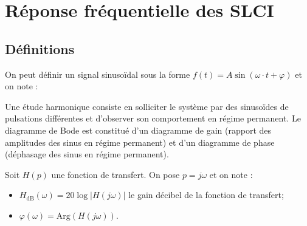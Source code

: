 \section{Réponse fréquentielle des SLCI}


\subsection{Définitions}



On peut définir un signal sinusoïdal sous la forme $
f(t)=A \sin(\omega \cdot t + \varphi)
$ et on note :


Une étude harmonique consiste en solliciter le système par des sinusoïdes de pulsations différentes et d'observer son comportement en régime permanent. Le diagramme de Bode est constitué d'un diagramme de gain (rapport des amplitudes des sinus en régime permanent) et d'un diagramme de phase (déphasage des sinus en régime permanent). 


\begin{defi}
Soit $H(p)$ une fonction de transfert. On pose $p=j\omega$ et on note :  
\begin{itemize}
\item $H_{\text{dB}}\left( \omega\right) =20\log |H(j\omega)|$ le gain décibel de la fonction de transfert;
\item $\varphi\left( \omega\right) = \text{Arg}\left(H(j\omega) \right)$.
\end{itemize}
\end{defi}

